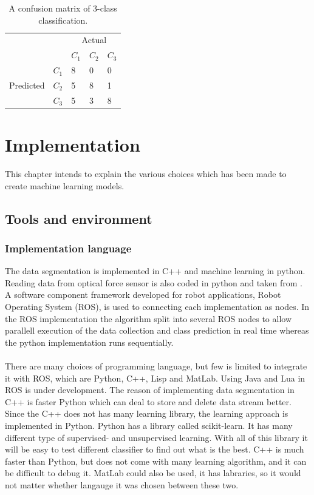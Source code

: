 \documentclass[USenglish]{ifimaster}  %
\begin{document}
\begin{table}[h]
\centering
\begin{tabular}{ll|l|l|l|}
\cline{3-5}
 &  & \multicolumn{3}{c|}{Actual} \\ \cline{3-5} 
 &  & $C_1$ & $C_2$ & $C_3$ \\ \hline
\multicolumn{1}{|l|}{\multirow{3}{*}{Predicted}} & $C_1$ & 8 & 0 & 0 \\ \cline{2-5} 
\multicolumn{1}{|l|}{} & $C_2$ & 5 & 8 & 1 \\ \cline{2-5} 
\multicolumn{1}{|l|}{} & $C_3$ & 5 & 3 & 8 \\ \hline
\end{tabular}
\caption{A confusion matrix of 3-class classification.}
\label{tab:cmatrix}
\end{table}

\chapter{Implementation}        %
This chapter intends to explain the various choices which has been made to create machine learning models.


\section{Tools and environment}

\subsection{Implementation language}
The data segmentation is implemented in C++ and machine learning in python. Reading data from optical force sensor is also coded in python and taken from \cite{optoRos}. A software component framework developed for robot applications, Robot Operating System (ROS), is used to connecting each implementation as nodes. In the ROS implementation the algorithm split into several ROS nodes to allow parallell execution of the data collection and class prediction in real time whereas the python implementation runs sequentially.
\\
\\
There are many choices of programming language, but few is limited to integrate it with ROS, which are Python, C++, Lisp and MatLab. Using Java and Lua in ROS is under development. The reason of implementing data segmentation in C++ is faster Python which can deal to store and delete data stream better. Since the C++ does not has many learning library, the learning approach is implemented in Python. Python has a library called scikit-learn. It has many different type of supervised- and unsupervised learning. With all of this library it will be easy to test different classifier to find out what is the best. C++ is much faster than Python, but does not come with many learning algorithm, and it can be difficult to debug it. MatLab could also be used, it has labraries, so it would not matter whether langauge it was chosen between these two.
\end{document}

